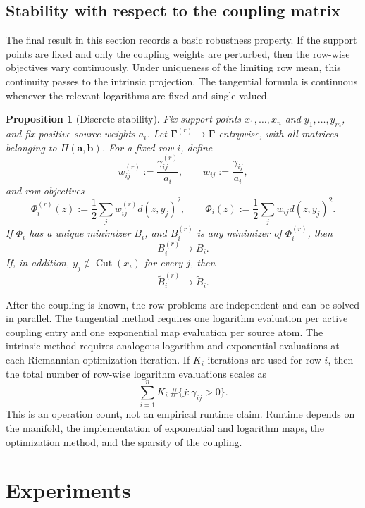 \documentclass[10pt]{article} %
\newtheorem{proposition}[proposition]{Proposition}
\theoremstyle{definition}
\providecommand{\1}{\mathbf{1}}
\providecommand{\va}{\mathbf{a}}
\providecommand{\vb}{\mathbf{b}}
\providecommand{\mGamma}{\boldsymbol{\Gamma}}
\DeclareMathOperator{\Cut}{Cut}
\begin{document}
\subsection{Stability with respect to the coupling matrix}

The final result in this section records a basic robustness property. If the support points are fixed and only the coupling weights are perturbed, then the row-wise objectives vary continuously. Under uniqueness of the limiting row mean, this continuity passes to the intrinsic projection. The tangential formula is continuous whenever the relevant logarithms are fixed and single-valued.

\begin{proposition}[Discrete stability]
\label{prop:discrete_stability}
Fix support points $x_1,\dots,x_n$ and $y_1,\dots,y_m$, and fix positive source weights $a_i$. Let $\mGamma^{(r)}\to\mGamma$ entrywise, with all matrices belonging to $\Pi(\va,\vb)$. For a fixed row $i$, define
\[
w_{ij}^{(r)}:=\frac{\gamma_{ij}^{(r)}}{a_i},
\qquad
w_{ij}:=\frac{\gamma_{ij}}{a_i},
\]
and row objectives
\[
\Phi_i^{(r)}(z):=\frac12\sum_j w_{ij}^{(r)}d(z,y_j)^2,
\qquad
\Phi_i(z):=\frac12\sum_j w_{ij}d(z,y_j)^2.
\]
If $\Phi_i$ has a unique minimizer $B_i$, and $B_i^{(r)}$ is any minimizer of $\Phi_i^{(r)}$, then
\[
B_i^{(r)}\to B_i.
\]
If, in addition, $y_j\notin\Cut(x_i)$ for every $j$, then
\[
\widetilde B_i^{(r)}\to \widetilde B_i.
\]
\end{proposition}



After the coupling is known, the row problems are independent and can be solved in parallel. The tangential method requires one logarithm evaluation per active coupling entry and one exponential map evaluation per source atom. The intrinsic method requires analogous logarithm and exponential evaluations at each Riemannian optimization iteration. If $K_i$ iterations are used for row $i$, then the total number of row-wise logarithm evaluations scales as
\[
\sum_{i=1}^n K_i\,\#\{j:\gamma_{ij}>0\}.
\]
This is an operation count, not an empirical runtime claim. Runtime depends on the manifold, the implementation of exponential and logarithm maps, the optimization method, and the sparsity of the coupling.


\section{Experiments}
\label{sec:experiments}
\end{document}
